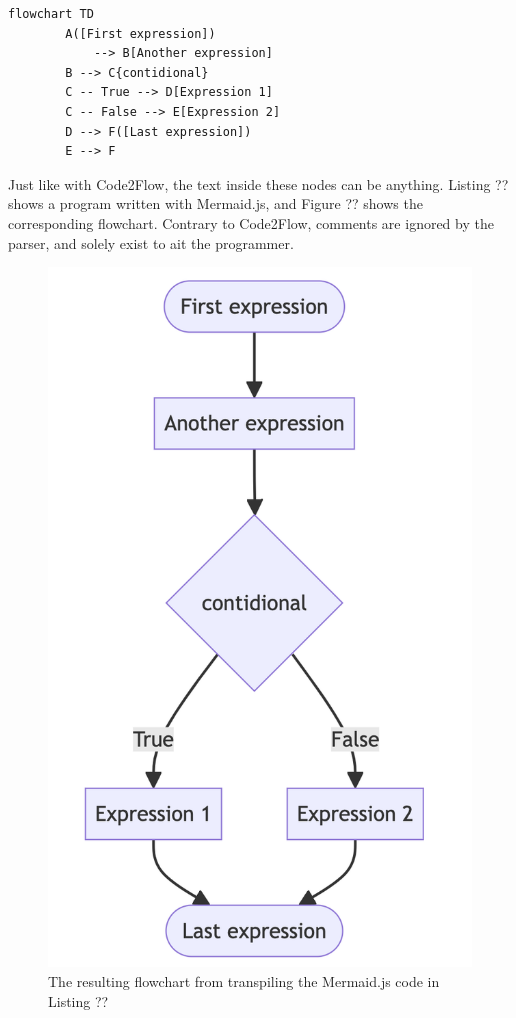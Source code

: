 \begin{lstlisting}[caption={A mermaid.js program}, captionpos=b, frame=trbl]
    flowchart TD
        A([First expression])
            --> B[Another expression]
        B --> C{contidional}
        C -- True --> D[Expression 1]
        C -- False --> E[Expression 2]
        D --> F([Last expression])
        E --> F
\end{lstlisting}

Just like with Code2Flow, the text inside these nodes can be anything. Listing ?? shows a program written with Mermaid.js, and Figure ?? shows the corresponding flowchart. Contrary to Code2Flow, comments are ignored by the parser, and solely exist to ait the programmer. \\

\begin{figure}[ht]
    \centering
    \includegraphics[scale=.5]{assets/mermaidjs.png}
    \caption{The resulting flowchart from transpiling the Mermaid.js code in Listing ??}
    \label{fig:code2flow}
\end{figure}

